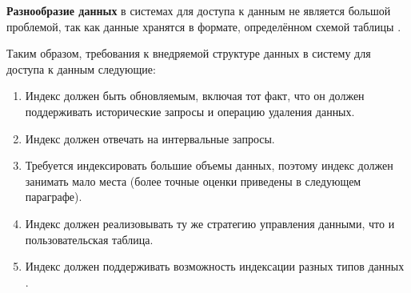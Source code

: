 \textbf{Разнообразие данных} в системах для доступа к данным не является большой проблемой, так как данные хранятся в формате, определённом схемой таблицы \cite{Hudi_SQL_DDL}.

Таким образом, требования к внедряемой структуре данных в систему для доступа к данным следующие:
\begin{enumerate}
    \item Индекс должен быть обновляемым, включая тот факт, что он должен поддерживать исторические запросы и операцию удаления данных.
    \item Индекс должен отвечать на интервальные запросы.
    \item Требуется индексировать большие объемы данных, поэтому индекс должен занимать мало места (более точные оценки приведены в следующем параграфе).
    \item Индекс должен реализовывать ту же стратегию управления данными, что и пользовательская таблица.
    \item Индекс должен поддерживать возможность индексации разных типов данных .
\end{enumerate}
